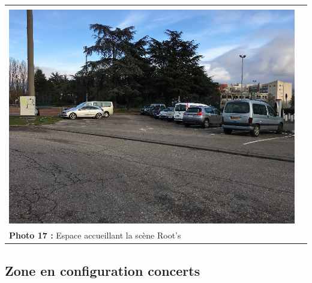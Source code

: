 \documentclass[hidelinks, paper=a4, fontsize=13pt]{report}
\begin{document}
\begin{center}
\begin{tabular}{ll}
\vspace{0.2 cm}\\
\includegraphics[width=.45\textwidth]{Annexes/Exports/Photo_17} &  \\
\textbf{Photo 17 :} Espace accueillant la scène Root's&\\
\end{tabular}
\end{center}

\subsection{Zone en configuration concerts}
\end{document}
